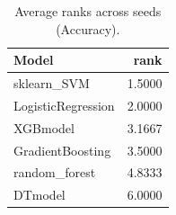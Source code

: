 \begin{table}[t]
\centering
\begin{tabular}{lr}
\toprule
Model & rank \\
\midrule
sklearn_SVM & 1.5000 \\
LogisticRegression & 2.0000 \\
XGBmodel & 3.1667 \\
GradientBoosting & 3.5000 \\
random_forest & 4.8333 \\
DTmodel & 6.0000 \\
\bottomrule
\end{tabular}
\caption{Average ranks across seeds (Accuracy).}
\label{tab:avg_rank_Accuracy}
\end{table}